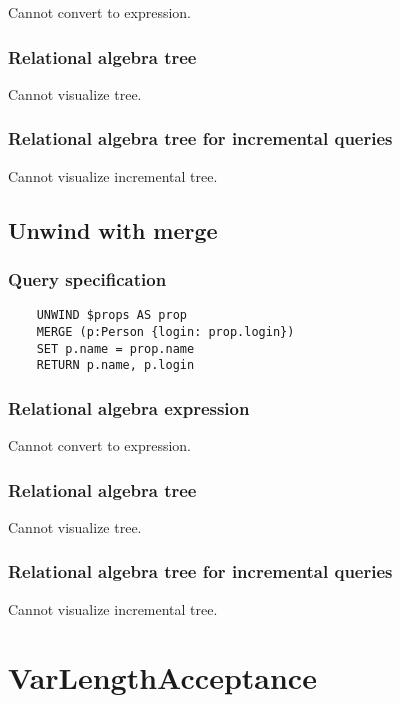 	Cannot convert to expression.

	\subsubsection*{Relational algebra tree}

	Cannot visualize tree.

	\subsubsection*{Relational algebra tree for incremental queries}

	Cannot visualize incremental tree.
	\subsection{Unwind with merge}

	\subsubsection*{Query specification}

	\begin{lstlisting}
	UNWIND $props AS prop
	MERGE (p:Person {login: prop.login})
	SET p.name = prop.name
	RETURN p.name, p.login
	\end{lstlisting}


	\subsubsection*{Relational algebra expression}

	Cannot convert to expression.

	\subsubsection*{Relational algebra tree}

	Cannot visualize tree.

	\subsubsection*{Relational algebra tree for incremental queries}

	Cannot visualize incremental tree.

	\section{VarLengthAcceptance}

